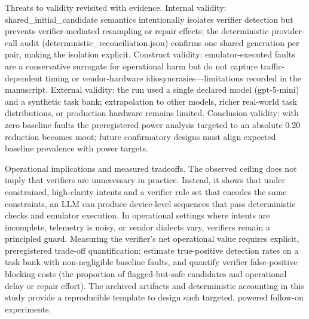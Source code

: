 \documentclass[conference]{IEEEtran}
\begin{document}
Threats to validity revisited with evidence. Internal validity: shared\_initial\_candidate semantics intentionally isolates verifier detection but prevents verifier-mediated resampling or repair effects; the deterministic provider-call audit (deterministic\_reconciliation.json) confirms one shared generation per pair, making the isolation explicit. Construct validity: emulator-executed faults are a conservative surrogate for operational harm but do not capture traffic-dependent timing or vendor-hardware idiosyncrasies---limitations recorded in the manuscript. External validity: the run used a single declared model (gpt-5-mini) and a synthetic task bank; extrapolation to other models, richer real-world task distributions, or production hardware remains limited. Conclusion validity: with zero baseline faults the preregistered power analysis targeted to an absolute 0.20 reduction becomes moot; future confirmatory designs must align expected baseline prevalence with power targets.

Operational implications and measured tradeoffs. The observed ceiling does not imply that verifiers are unnecessary in practice. Instead, it shows that under constrained, high-clarity intents and a verifier rule set that encodes the same constraints, an LLM can produce device-level sequences that pass deterministic checks and emulator execution. In operational settings where intents are incomplete, telemetry is noisy, or vendor dialects vary, verifiers remain a principled guard. Measuring the verifier's net operational value requires explicit, preregistered trade-off quantification: estimate true-positive detection rates on a task bank with non-negligible baseline faults, and quantify verifier false-positive blocking costs (the proportion of flagged-but-safe candidates and operational delay or repair effort). The archived artifacts and deterministic accounting in this study provide a reproducible template to design such targeted, powered follow-on experiments.
\end{document}
